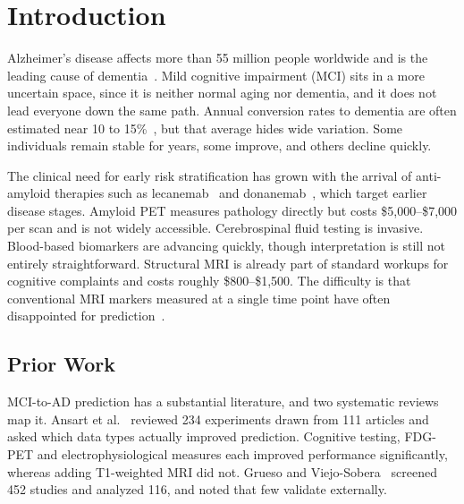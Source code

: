 \documentclass[blue]{ludusofficial}  %
\begin{document}
\maketitle

\section{Introduction}

Alzheimer's disease affects more than 55 million people worldwide and is the leading cause of dementia~\cite{hafeez2024deep}. Mild cognitive impairment (MCI) sits in a more uncertain space, since it is neither normal aging nor dementia, and it does not lead everyone down the same path. Annual conversion rates to dementia are often estimated near 10 to 15\%~\cite{li2021predicting}, but that average hides wide variation. Some individuals remain stable for years, some improve, and others decline quickly.

The clinical need for early risk stratification has grown with the arrival of anti-amyloid therapies such as lecanemab~\cite{vanDyck2022lecanemab} and donanemab~\cite{sims2023donanemab}, which target earlier disease stages. Amyloid PET measures pathology directly but costs \$5,000--\$7,000 per scan and is not widely accessible. Cerebrospinal fluid testing is invasive. Blood-based biomarkers are advancing quickly, though interpretation is still not entirely straightforward. Structural MRI is already part of standard workups for cognitive complaints and costs roughly \$800--\$1,500. The difficulty is that conventional MRI markers measured at a single time point have often disappointed for prediction~\cite{baytas2024predicting}.

\subsection{Prior Work}

MCI-to-AD prediction has a substantial literature, and two systematic reviews map it. Ansart et al.~\cite{ansart2021predicting} reviewed 234 experiments drawn from 111 articles and asked which data types actually improved prediction. Cognitive testing, FDG-PET and electrophysiological measures each improved performance significantly, whereas adding T1-weighted MRI did not. Grueso and Viejo-Sobera~\cite{grueso2021machine} screened 452 studies and analyzed 116, and noted that few validate externally.
\end{document}
